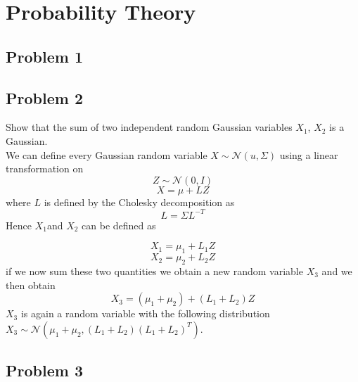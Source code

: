 \section{Probability Theory}


\subsection*{Problem 1}


\subsection*{Problem 2}

Show that the sum of two independent random Gaussian variables $X_{1}$,
$X_{2}$ is a Gaussian. \\
We can define every Gaussian random variable $X\sim\mathcal{N}(u,\Sigma)$
using a linear transformation on 
\[
Z\sim\mathcal{N}(0,I)
\]
\[
X=\mu+LZ
\]
 where $L$ is defined by the Cholesky decomposition as 
 \[
 L=\Sigma L^{-T}
 \]
 Hence $X_{1}$and $X_{2}$ can be defined as

 \[
 X_{1}=\mu_{1}+L_{1}Z
 \]
 \[
 X_{2}=\mu_{2}+L_{2}Z
 \]
  if we now sum these two quantities we obtain a new random variable
      $X_{3}$ and we then obtain
      \[
      X_{3}=(\mu_{1}+\mu_{2})+(L_{1}+L_{2})Z
      \]
       $X_{3}$ is again a random variable with the following distribution
       $X_{3}\sim\mathcal{N}(\mu_{1}+\mu_{2},(L_{1}+L_{2})(L_{1}+L_{2})^{T})$.

\subsection*{Problem 3}
